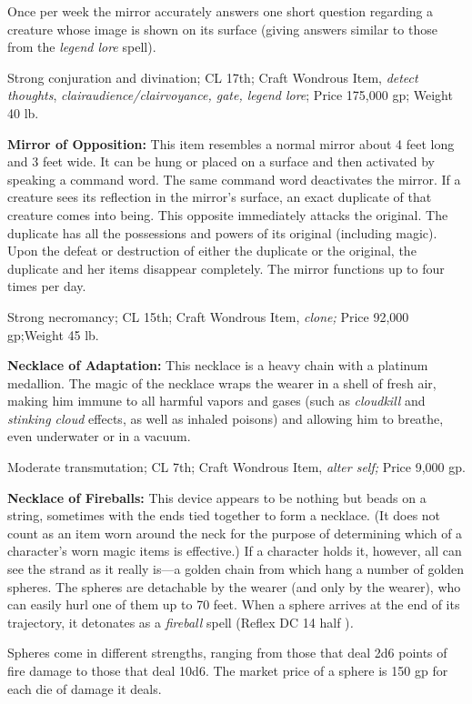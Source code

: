 \documentclass{article}
\begin{document}
Once per week the mirror accurately answers one short question regarding a creature 
whose image is shown on its surface (giving answers similar to those from the \textit{legend 
lore }spell).

\parindent=0pt
Strong conjuration and divination; CL 17th; Craft Wondrous Item, \textit{detect 
thoughts}, \textit{clairaudience/clairvoyance, gate, legend lore}; Price 175,000 
gp; Weight 40 lb.

\textbf{Mirror of Opposition:} This item resembles a normal mirror about 4 feet 
long and 3 feet wide. It can be hung or placed on a surface and then activated 
by speaking a command word. The same command word deactivates the mirror. If a 
creature sees its reflection in the mirror's surface, an exact duplicate of that 
creature comes into being. This opposite immediately attacks the original. The 
duplicate has all the possessions and powers of its original (including magic). 
Upon the defeat or destruction of either the duplicate or the original, the duplicate 
and her items disappear completely. The mirror functions up to four times per day.

Strong necromancy; CL 15th; Craft Wondrous Item, \textit{clone; }Price 92,000 gp;Weight 
45 lb.

\textbf{Necklace of Adaptation:} This necklace is a heavy chain with a platinum 
medallion. The magic of the necklace wraps the wearer in a shell of fresh air, 
making him immune to all harmful vapors and gases (such as \textit{cloudkill }and 
\textit{stinking cloud }effects, as well as inhaled poisons) and allowing him to 
breathe, even underwater or in a vacuum.

Moderate transmutation; CL 7th; Craft Wondrous Item, \textit{alter self; }Price 
9,000 gp.

\textbf{Necklace of Fireballs:} This device appears to be nothing but beads on 
a string, sometimes with the ends tied together to form a necklace. (It does not 
count as an item worn around the neck for the purpose of determining which of a 
character's worn magic items is effective.) If a character holds it, however, all 
can see the strand as it really is---a golden chain from which hang a number of 
golden spheres. The spheres are detachable by the wearer (and only by the wearer), 
who can easily hurl one of them up to 70 feet. When a sphere arrives at the end 
of its trajectory, it detonates as a \textit{fireball }spell (Reflex DC 14 half 
)\textit{.}

Spheres come in different strengths, ranging from those that deal 2d6 points of 
fire damage to those that deal 10d6. The market price of a sphere is 150 gp for 
each die of damage it deals.
\end{document}
